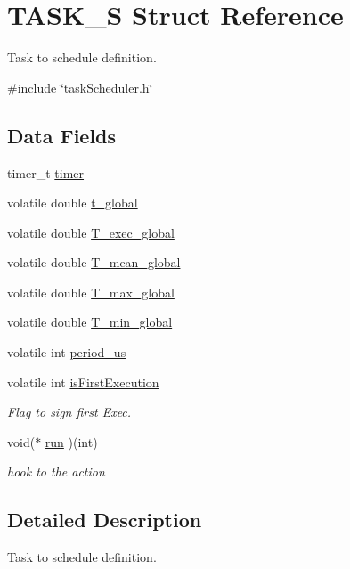 \hypertarget{structTASK__S}{\section{T\-A\-S\-K\-\_\-\-S Struct Reference}
\label{structTASK__S}
}


Task to schedule definition.  




{\ttfamily \#include \char`\"{}task\-Scheduler.\-h\char`\"{}}

\subsection*{Data Fields}
\begin{DoxyCompactItemize}
\item 
timer\-\_\-t \hyperlink{structTASK__S_a17834f3d4f84241ccb4191f3cf7d7af3}{timer}
\item 
volatile double \hyperlink{structTASK__S_a29a175bdd4b9f880a2b69bb5186e3c7e}{t\-\_\-global}
\item 
volatile double \hyperlink{structTASK__S_ae06b712fd9963cff8192e9ef3140bc6d}{T\-\_\-exec\-\_\-global}
\item 
volatile double \hyperlink{structTASK__S_a9ebae87e1b64869f328a47473f2ea7d7}{T\-\_\-mean\-\_\-global}
\item 
volatile double \hyperlink{structTASK__S_a430c874cbf361b6dbc75ad1540880948}{T\-\_\-max\-\_\-global}
\item 
volatile double \hyperlink{structTASK__S_a07174e333a0013f4d51b30509b388f58}{T\-\_\-min\-\_\-global}
\item 
volatile int \hyperlink{structTASK__S_aabd8f80831e6cfd8e51bbd371eed907b}{period\-\_\-us}
\item 
volatile int \hyperlink{structTASK__S_a4b50404ee955691f1c62845cdc9de676}{is\-First\-Execution}
\begin{DoxyCompactList}\small\item\em Flag to sign first Exec. \end{DoxyCompactList}\item 
void($\ast$ \hyperlink{structTASK__S_a6ce7396d04fd08be26e2e8b75a276122}{run} )(int)
\begin{DoxyCompactList}\small\item\em hook to the action \end{DoxyCompactList}\end{DoxyCompactItemize}


\subsection{Detailed Description}
Task to schedule definition. 

